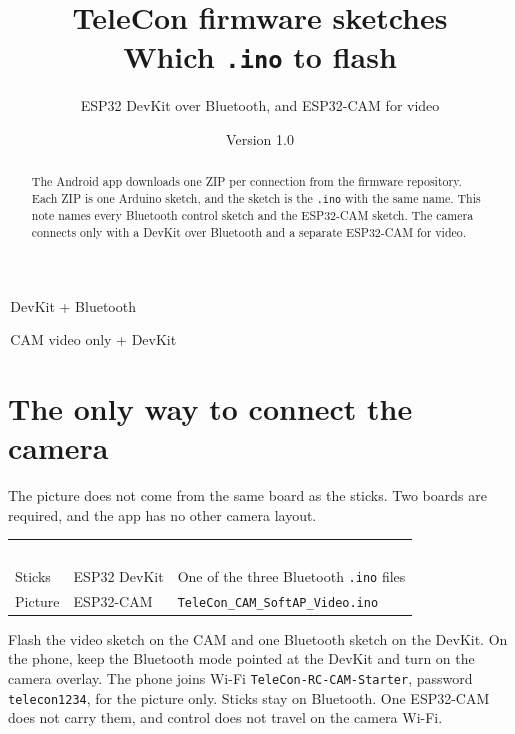 \documentclass[12pt,a4paper]{article}
\title{TeleCon firmware sketches\\[0.3em]
\large Which \texttt{.ino} to flash}
\author{ESP32 DevKit over Bluetooth, and ESP32-CAM for video}
\date{Version 1.0 \quad 2026}
\newcommand{\thc}[1]{\textcolor{white}{\bfseries #1}}
\newcommand{\chip}[2]{\colorbox{#1}{\strut\,\scriptsize #2\,}}
\begin{document}
\maketitle

\begin{abstract}
The Android app downloads one ZIP per connection from the firmware
repository. Each ZIP is one Arduino sketch, and the sketch is the
\texttt{.ino} with the same name. This note names every Bluetooth control
sketch and the ESP32-CAM sketch. The camera connects only with a DevKit
over Bluetooth and a separate ESP32-CAM for video.
\end{abstract}

{\sffamily\scriptsize
\chip{TblChan}{DevKit + Bluetooth}
\chip{TblTelem}{CAM video only + DevKit}}

\tableofcontents
\vspace{1em}

\section{The only way to connect the camera}

The picture does not come from the same board as the sticks. Two boards
are required, and the app has no other camera layout.

\begin{center}
\renewcommand{\arraystretch}{1.28}
\setlength{\tabcolsep}{5pt}
\begin{tabular}{>{\raggedright\arraybackslash}p{3.6cm}
                >{\raggedright\arraybackslash}p{5.4cm}
                >{\raggedright\arraybackslash}p{5.2cm}}
\rowcolor{TblHead}
\thc{Role} & \thc{Board} & \thc{Sketch} \\
\rowcolor{TblChan}
Sticks & ESP32 DevKit & One of the three Bluetooth \texttt{.ino} files \\
\rowcolor{TblTelem}
Picture & ESP32-CAM & \texttt{TeleCon\_CAM\_\-SoftAP\_Video.ino} \\
\end{tabular}
\end{center}

Flash the video sketch on the CAM and one Bluetooth sketch on the DevKit.
On the phone, keep the Bluetooth mode pointed at the DevKit and turn on
the camera overlay. The phone joins Wi-Fi \texttt{TeleCon-RC-CAM-Starter},
password \texttt{telecon1234}, for the picture only. Sticks stay on
Bluetooth. One ESP32-CAM does not carry them, and control does not travel
on the camera Wi-Fi.
\end{document}
